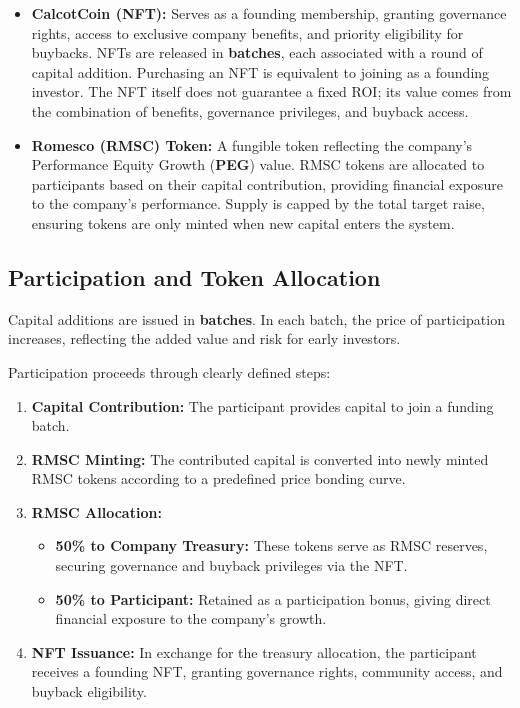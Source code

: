 \documentclass[conference]{IEEEtran}
\begin{document}
\begin{itemize}
    \item \textbf{CalcotCoin (NFT):} Serves as a founding membership, granting governance rights, access to exclusive company benefits, and priority eligibility for buybacks. NFTs are released in \textbf{batches}, each associated with a round of capital addition. Purchasing an NFT is equivalent to joining as a founding investor. The NFT itself does not guarantee a fixed ROI; its value comes from the combination of benefits, governance privileges, and buyback access.

    \item \textbf{Romesco (RMSC) Token:} A fungible token reflecting the company’s Performance Equity Growth (\textbf{PEG}) value. RMSC tokens are allocated to participants based on their capital contribution, providing financial exposure to the company’s performance. Supply is capped by the total target raise, ensuring tokens are only minted when new capital enters the system.
\end{itemize}

\subsection{Participation and Token Allocation}
Capital additions are issued in \textbf{batches}. In each batch, the price of participation increases, reflecting the added value and risk for early investors.

Participation proceeds through clearly defined steps:

\begin{enumerate}
    \item \textbf{Capital Contribution:} The participant provides capital to join a funding batch.
    \item \textbf{RMSC Minting:} The contributed capital is converted into newly minted RMSC tokens according to a predefined price bonding curve.
    \item \textbf{RMSC Allocation:}
    \begin{itemize}
        \item \textbf{50\% to Company Treasury:} These tokens serve as RMSC reserves, securing governance and buyback privileges via the NFT.
        \item \textbf{50\% to Participant:} Retained as a participation bonus, giving direct financial exposure to the company's growth.
    \end{itemize}
    \item \textbf{NFT Issuance:} In exchange for the treasury allocation, the participant receives a founding NFT, granting governance rights, community access, and buyback eligibility.
\end{enumerate}
\end{document}
